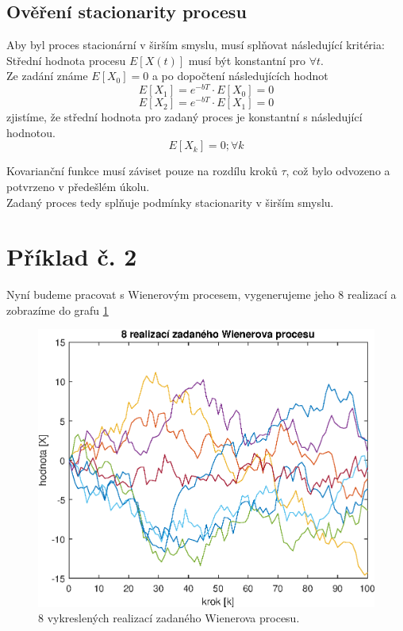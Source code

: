 \documentclass{article}
\begin{document}
		\subsection{Ověření stacionarity procesu}
			Aby byl proces stacionární v širším smyslu, musí splňovat následující kritéria:\\
			
			\noindent
			Střední hodnota procesu \(E[X(t)]\) musí být konstantní pro \(\forall t\).\\
			Ze zadání známe \(E[X_{0}]=0\) a po dopočtení následujících hodnot
			\[E[X_{1}]=e^{-bT}\cdot E[X_{0}]=0\]
			\[E[X_{2}]=e^{-bT}\cdot E[X_{1}]=0\]
			zjistíme, že střední hodnota pro zadaný proces je konstantní s následující hodnotou.
			\[E[X_{k}]=0 ;\forall k\]
			
			Kovarianční funkce musí záviset pouze na rozdílu kroků \(\tau\), což bylo odvozeno a potvrzeno v předešlém úkolu.\\
			
			Zadaný proces tedy splňuje podmínky stacionarity v širším smyslu.
		
	\newpage	
	\section{Příklad č. 2}
		Nyní budeme pracovat s Wienerovým procesem, vygenerujeme jeho 8 realizací a zobrazíme do grafu \ref{pic:priklad_02_realizace_procesu}  
		\begin{figure}[H]
			\centering
			\includegraphics[width=.5\textwidth]{./Graphics/priklad_02_realizace_procesu}
			\caption{8 vykreslených realizací zadaného Wienerova procesu.}
			\label{pic:priklad_02_realizace_procesu}
		\end{figure}
\end{document}
